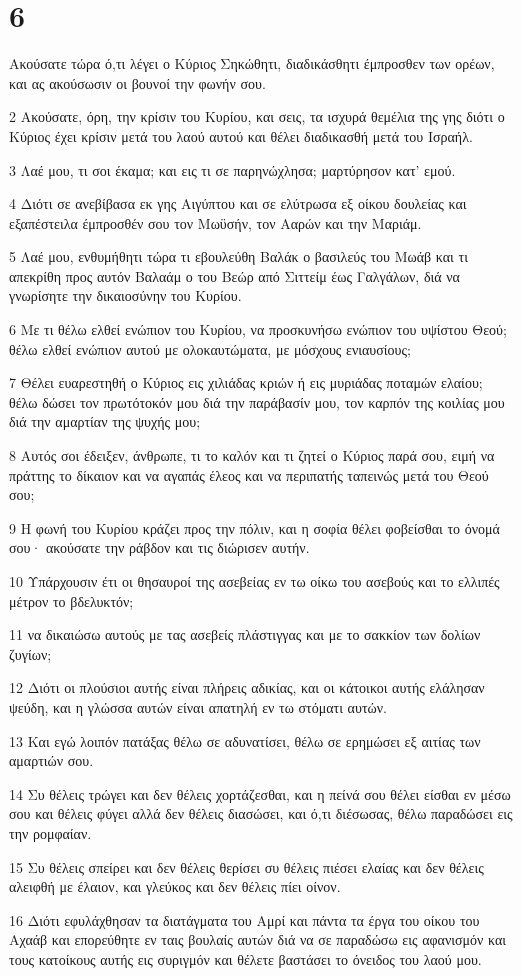 \chapter{6}

\par Ακούσατε τώρα ό,τι λέγει ο Κύριος Σηκώθητι, διαδικάσθητι έμπροσθεν των ορέων, και ας ακούσωσιν οι βουνοί την φωνήν σου.
\par 2 Ακούσατε, όρη, την κρίσιν του Κυρίου, και σεις, τα ισχυρά θεμέλια της γης διότι ο Κύριος έχει κρίσιν μετά του λαού αυτού και θέλει διαδικασθή μετά του Ισραήλ.
\par 3 Λαέ μου, τι σοι έκαμα; και εις τι σε παρηνώχλησα; μαρτύρησον κατ' εμού.
\par 4 Διότι σε ανεβίβασα εκ γης Αιγύπτου και σε ελύτρωσα εξ οίκου δουλείας και εξαπέστειλα έμπροσθέν σου τον Μωϋσήν, τον Ααρών και την Μαριάμ.
\par 5 Λαέ μου, ενθυμήθητι τώρα τι εβουλεύθη Βαλάκ ο βασιλεύς του Μωάβ και τι απεκρίθη προς αυτόν Βαλαάμ ο του Βεώρ από Σιττείμ έως Γαλγάλων, διά να γνωρίσητε την δικαιοσύνην του Κυρίου.
\par 6 Με τι θέλω ελθεί ενώπιον του Κυρίου, να προσκυνήσω ενώπιον του υψίστου Θεού; θέλω ελθεί ενώπιον αυτού με ολοκαυτώματα, με μόσχους ενιαυσίους;
\par 7 Θέλει ευαρεστηθή ο Κύριος εις χιλιάδας κριών ή εις μυριάδας ποταμών ελαίου; θέλω δώσει τον πρωτότοκόν μου διά την παράβασίν μου, τον καρπόν της κοιλίας μου διά την αμαρτίαν της ψυχής μου;
\par 8 Αυτός σοι έδειξεν, άνθρωπε, τι το καλόν και τι ζητεί ο Κύριος παρά σου, ειμή να πράττης το δίκαιον και να αγαπάς έλεος και να περιπατής ταπεινώς μετά του Θεού σου;
\par 9 Η φωνή του Κυρίου κράζει προς την πόλιν, και η σοφία θέλει φοβείσθαι το όνομά σου· ακούσατε την ράβδον και τις διώρισεν αυτήν.
\par 10 Υπάρχουσιν έτι οι θησαυροί της ασεβείας εν τω οίκω του ασεβούς και το ελλιπές μέτρον το βδελυκτόν;
\par 11 να δικαιώσω αυτούς με τας ασεβείς πλάστιγγας και με το σακκίον των δολίων ζυγίων;
\par 12 Διότι οι πλούσιοι αυτής είναι πλήρεις αδικίας, και οι κάτοικοι αυτής ελάλησαν ψεύδη, και η γλώσσα αυτών είναι απατηλή εν τω στόματι αυτών.
\par 13 Και εγώ λοιπόν πατάξας θέλω σε αδυνατίσει, θέλω σε ερημώσει εξ αιτίας των αμαρτιών σου.
\par 14 Συ θέλεις τρώγει και δεν θέλεις χορτάζεσθαι, και η πείνά σου θέλει είσθαι εν μέσω σου και θέλεις φύγει αλλά δεν θέλεις διασώσει, και ό,τι διέσωσας, θέλω παραδώσει εις την ρομφαίαν.
\par 15 Συ θέλεις σπείρει και δεν θέλεις θερίσει συ θέλεις πιέσει ελαίας και δεν θέλεις αλειφθή με έλαιον, και γλεύκος και δεν θέλεις πίει οίνον.
\par 16 Διότι εφυλάχθησαν τα διατάγματα του Αμρί και πάντα τα έργα του οίκου του Αχαάβ και επορεύθητε εν ταις βουλαίς αυτών διά να σε παραδώσω εις αφανισμόν και τους κατοίκους αυτής εις συριγμόν και θέλετε βαστάσει το όνειδος του λαού μου.

